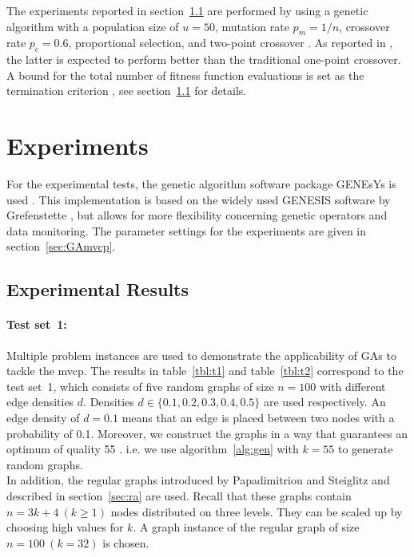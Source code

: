 \documentclass[12pt]{article}
\begin{document}
The experiments reported in section~\ref{sec:er} are performed
by using a genetic algorithm with a population size of
$u = 50$, mutation rate $p_m = 1/n$, crossover rate
$p_c = 0.6$, proportional selection, and two-point crossover \cite{mvcp-back}.
As reported in \cite{2:mvcp, 12:mvcp}, the latter is expected to perform
better than the traditional one-point crossover.
A bound for the total number
of fitness function evaluations is set as the termination
criterion \cite{mvcp-back}, see section~\ref{sec:er} for details.


\section{Experiments}
\label{sec:exper}
For the experimental tests,
the genetic algorithm software package GENEsYs is used \cite{1:misp}.
This implementation is based on the widely used GENESIS software by Grefenstette \cite{5:mvcp},
but allows for more  flexibility concerning genetic operators and data monitoring.
The parameter settings for the experiments are
given in section~\ref{sec:GAmvcp}.


\subsection{Experimental Results}
\label{sec:er}

\paragraph{Test set~1:}
Multiple problem instances are used to demonstrate the applicability of GAs to tackle the mvcp.
The results in table~\ref{tbl:t1}
and table~\ref{tbl:t2} correspond to the test set~1, which consists of
five random graphs of size $n = 100$ with different
edge densities $d$.
Densities $d \in \{0.1, 0.2, 0.3, 0.4, 0.5\}$ are used respectively.
An edge density of $d = 0.1$ means that an edge is placed between two
nodes with a probability of 0.1.
Moreover, we construct the graphs in a way that guarantees an optimum of quality 55 \cite{mvcp-back}.
i.e. we use algorithm~\ref{alg:gen} with $k = 55$ to generate random graphs.\\
In addition, the regular graphs introduced by
Papadimitriou and Steiglitz and described in section~\ref{sec:ra} are used.
Recall that these graphs contain $n=3k+4 \ (k \geq 1)$ nodes distributed on three levels.
They can be scaled up by choosing high values for $k$.
A graph instance of the regular graph of size $n = 100 \  (k=32)$ is chosen.
\end{document}
